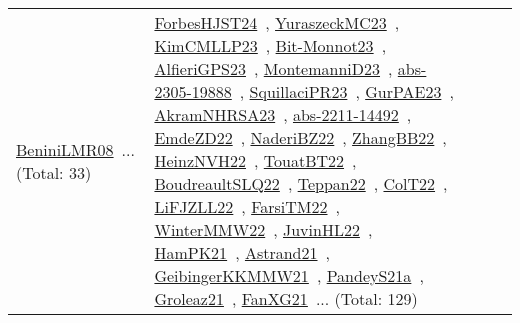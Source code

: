 {\begin{longtable}{lp{3cm}>{\raggedright\arraybackslash}p{6cm}>{\raggedright\arraybackslash}p{6cm}>{\raggedright\arraybackslash}p{8cm}}
\href{works/BeniniLMR08.pdf}{BeniniLMR08}~\cite{BeniniLMR08}... (Total: 33) & \href{works/ForbesHJST24.pdf}{ForbesHJST24}~\cite{ForbesHJST24}, \href{works/YuraszeckMC23.pdf}{YuraszeckMC23}~\cite{YuraszeckMC23}, \href{works/KimCMLLP23.pdf}{KimCMLLP23}~\cite{KimCMLLP23}, \href{works/Bit-Monnot23.pdf}{Bit-Monnot23}~\cite{Bit-Monnot23}, \href{works/AlfieriGPS23.pdf}{AlfieriGPS23}~\cite{AlfieriGPS23}, \href{works/MontemanniD23.pdf}{MontemanniD23}~\cite{MontemanniD23}, \href{works/abs-2305-19888.pdf}{abs-2305-19888}~\cite{abs-2305-19888}, \href{works/SquillaciPR23.pdf}{SquillaciPR23}~\cite{SquillaciPR23}, \href{works/GurPAE23.pdf}{GurPAE23}~\cite{GurPAE23}, \href{works/AkramNHRSA23.pdf}{AkramNHRSA23}~\cite{AkramNHRSA23}, \href{works/abs-2211-14492.pdf}{abs-2211-14492}~\cite{abs-2211-14492}, \href{works/EmdeZD22.pdf}{EmdeZD22}~\cite{EmdeZD22}, \href{works/NaderiBZ22.pdf}{NaderiBZ22}~\cite{NaderiBZ22}, \href{works/ZhangBB22.pdf}{ZhangBB22}~\cite{ZhangBB22}, \href{works/HeinzNVH22.pdf}{HeinzNVH22}~\cite{HeinzNVH22}, \href{works/TouatBT22.pdf}{TouatBT22}~\cite{TouatBT22}, \href{works/BoudreaultSLQ22.pdf}{BoudreaultSLQ22}~\cite{BoudreaultSLQ22}, \href{works/Teppan22.pdf}{Teppan22}~\cite{Teppan22}, \href{works/ColT22.pdf}{ColT22}~\cite{ColT22}, \href{works/LiFJZLL22.pdf}{LiFJZLL22}~\cite{LiFJZLL22}, \href{works/FarsiTM22.pdf}{FarsiTM22}~\cite{FarsiTM22}, \href{works/WinterMMW22.pdf}{WinterMMW22}~\cite{WinterMMW22}, \href{works/JuvinHL22.pdf}{JuvinHL22}~\cite{JuvinHL22}, \href{works/HamPK21.pdf}{HamPK21}~\cite{HamPK21}, \href{works/Astrand21.pdf}{Astrand21}~\cite{Astrand21}, \href{works/GeibingerKKMMW21.pdf}{GeibingerKKMMW21}~\cite{GeibingerKKMMW21}, \href{works/PandeyS21a.pdf}{PandeyS21a}~\cite{PandeyS21a}, \href{works/Groleaz21.pdf}{Groleaz21}~\cite{Groleaz21}, \href{works/FanXG21.pdf}{FanXG21}~\cite{FanXG21}... (Total: 129)\\

\end{longtable}}

